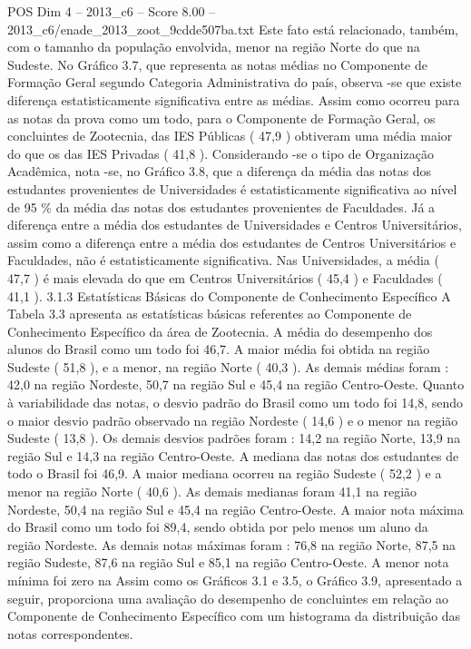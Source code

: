 \begin{textsample}{POS Dim 4 – 2013\_c6 – Score 8.00 – 2013\_c6/enade\_2013\_zoot\_9cdde507ba.txt}
Este fato está relacionado, também, com o tamanho da população envolvida, menor na região Norte do que na Sudeste.
No Gráfico 3.7, que representa as notas médias no Componente de Formação Geral segundo Categoria Administrativa do país, observa -se que existe diferença estatisticamente significativa entre as médias.
Assim como ocorreu para as notas da prova como um todo, para o Componente de Formação Geral, os concluintes de Zootecnia, das IES Públicas ( 47,9 ) obtiveram uma média maior do que os das IES Privadas ( 41,8 ).
Considerando -se o tipo de Organização Acadêmica, nota -se, no Gráfico 3.8, que a diferença da média das notas dos estudantes provenientes de Universidades é estatisticamente significativa ao nível de 95 \% da média das notas dos estudantes provenientes de Faculdades.
Já a diferença entre a média dos estudantes de Universidades e Centros Universitários, assim como a diferença entre a média dos estudantes de Centros Universitários e Faculdades, não é estatisticamente significativa.
Nas Universidades, a média ( 47,7 ) é mais elevada do que em Centros Universitários ( 45,4 ) e Faculdades ( 41,1 ). 3.1.3 Estatísticas Básicas do Componente de Conhecimento Específico A Tabela 3.3 apresenta as estatísticas básicas referentes ao Componente de Conhecimento Específico da área de Zootecnia.
A média do desempenho dos alunos do Brasil como um todo foi 46,7.
A maior média foi obtida na região Sudeste ( 51,8 ), e a menor, na região Norte ( 40,3 ).
As demais médias foram : 42,0 na região Nordeste, 50,7 na região Sul e 45,4 na região Centro-Oeste.
Quanto à variabilidade das notas, o desvio padrão do Brasil como um todo foi 14,8, sendo o maior desvio padrão observado na região Nordeste ( 14,6 ) e o menor na região Sudeste ( 13,8 ).
Os demais desvios padrões foram : 14,2 na região Norte, 13,9 na região Sul e 14,3 na região Centro-Oeste.
A mediana das notas dos estudantes de todo o Brasil foi 46,9.
A maior mediana ocorreu na região Sudeste ( 52,2 ) e a menor na região Norte ( 40,6 ).
As demais medianas foram 41,1 na região Nordeste, 50,4 na região Sul e 45,4 na região Centro-Oeste.
A maior nota máxima do Brasil como um todo foi 89,4, sendo obtida por pelo menos um aluno da região Nordeste.
As demais notas máximas foram : 76,8 na região Norte, 87,5 na região Sudeste, 87,6 na região Sul e 85,1 na região Centro-Oeste.
A menor nota mínima foi zero na Assim como os Gráficos 3.1 e 3.5, o Gráfico 3.9, apresentado a seguir, proporciona uma avaliação do desempenho de concluintes em relação ao Componente de Conhecimento Específico com um histograma da distribuição das notas correspondentes.

\end{textsample}
